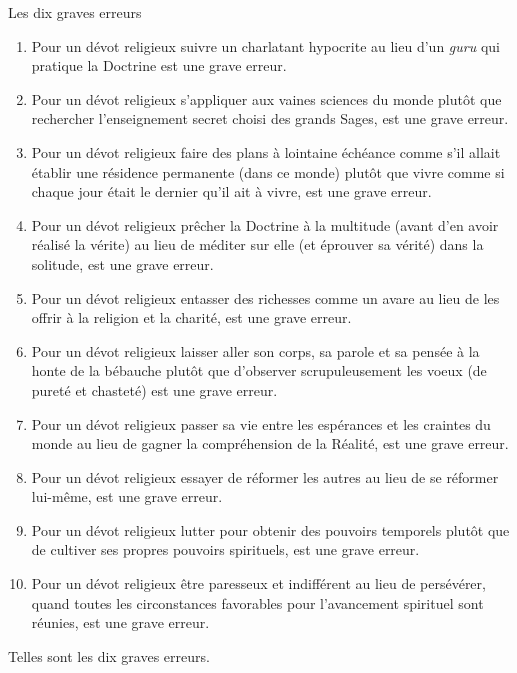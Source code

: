 \documentclass[10pt]{book}
\makeatletter
\renewcommand{\section}{\@startsection{section}{0}{0mm}
   {\baselineskip}
   {\baselineskip}{\normalfont\normalsize\scshape\centering}
}
\makeatother
\begin{document}
\section{Les dix graves erreurs}
\begin{enumerate}[1.-]
\item Pour un dévot religieux suivre un charlatant hypocrite au lieu d'un \textit{guru} qui pratique la Doctrine est une grave erreur.
\item Pour un dévot religieux s'appliquer aux vaines sciences du monde plutôt que rechercher l'enseignement secret choisi des grands Sages, est une grave erreur.
\item Pour un dévot religieux faire des plans à lointaine échéance comme s'il allait établir une résidence permanente (dans ce monde) plutôt que vivre comme si chaque jour était le dernier qu'il ait à vivre, est une grave erreur.
\item Pour un dévot religieux prêcher la Doctrine à la multitude (avant d'en avoir réalisé la vérite) au lieu de méditer sur elle (et éprouver sa vérité) dans la solitude, est une grave erreur.
\item Pour un dévot religieux entasser des richesses comme un avare au lieu de les offrir à la religion et la charité, est une grave erreur.
\item Pour un dévot religieux laisser aller son corps, sa parole et sa pensée à la honte de la bébauche plutôt que d'observer scrupuleusement les voeux (de pureté et chasteté) est une grave erreur.
\item Pour un dévot religieux passer sa vie entre les espérances et les craintes du monde au lieu de gagner la compréhension de la Réalité, est une grave erreur.
\item Pour un dévot religieux essayer de réformer les autres au lieu de se réformer lui-même, est une grave erreur.
\item Pour un dévot religieux lutter pour obtenir des pouvoirs temporels plutôt que de cultiver ses propres pouvoirs spirituels, est une grave erreur.
\item Pour un dévot religieux être paresseux et indifférent au lieu de persévérer, quand toutes les circonstances favorables pour l'avancement spirituel sont réunies, est une grave erreur.
\end{enumerate}
Telles sont les dix graves erreurs.
\end{document}
